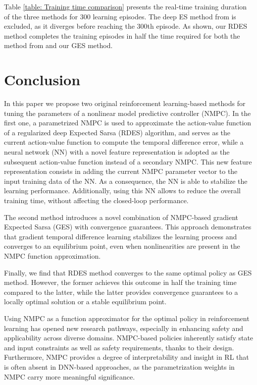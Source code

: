 \documentclass[letterpaper, 10pt, conference]{ieeeconf}
\begin{document}
Table \ref{table: Training time comparison} presents the real-time training duration of the three methods for 300 learning episodes.
The deep ES method from \cite{moradimaryamnegari2023data} is excluded, as it diverges before reaching the 300th episode.
As shown, our RDES method completes the training episodes in half the time required for both the method from \cite{moradimaryamnegari2022model} and our GES method.

\section{Conclusion}

In this paper we propose two original reinforcement learning-based methods for tuning the parameters of a nonlinear model predictive controller (NMPC).
In the first one, a parametrized NMPC is used to approximate the action-value function of a regularized deep Expected Sarsa (RDES) algorithm, and serves as the current action-value function to compute the temporal difference error, while a neural network (NN) with a novel feature representation is adopted as the subsequent action-value function instead of a secondary NMPC.
This new feature representation consists in adding the current NMPC parameter vector to the input training data of the NN.
As a consequence, the NN is able to stabilize the learning performance.
Additionally, using this NN allows to reduce the overall training time, without affecting the closed-loop performance. 

The second method introduces a novel combination of NMPC-based gradient Expected Sarsa (GES) with convergence guarantees.
This approach demonstrates that gradient temporal difference learning stabilizes the learning process and converges to an equilibrium point, even when nonlinearities are present in the NMPC function approximation.

Finally, we find that RDES method converges to the same optimal policy as GES method.
However, the former achieves this outcome in half the training time compared to the latter, while the latter provides convergence guarantees to a locally optimal solution or a stable equilibrium point.

Using NMPC as a function approximator for the optimal policy in reinforcement learning has opened new research pathways, especially in enhancing safety and applicability across diverse domains.
NMPC-based policies inherently satisfy state and input constraints as well as safety requirements, thanks to their design.
Furthermore, NMPC provides a degree of interpretability and insight in RL that is often absent in DNN-based approaches, as the parametrization weights in NMPC carry more meaningful significance.



\end{document}

